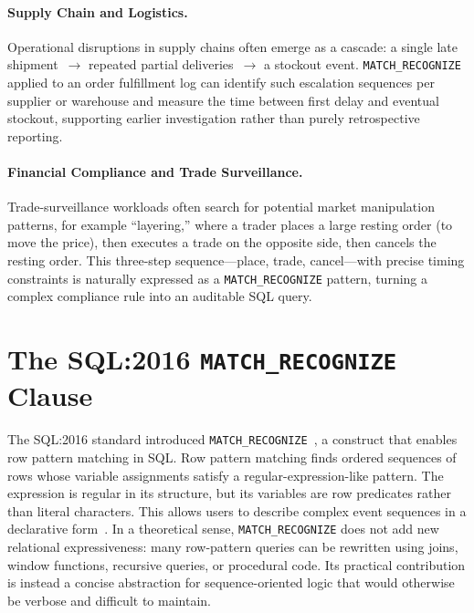 \paragraph{Supply Chain and Logistics.}
Operational disruptions in supply chains often emerge as a cascade:
a single late shipment~$\rightarrow$ repeated partial deliveries~$\rightarrow$
a stockout event.  \texttt{MATCH\_RECOGNIZE} applied to an order
fulfillment log can identify such escalation sequences per supplier or
warehouse and measure the time between first delay and eventual
stockout, supporting earlier investigation rather than purely
retrospective reporting.

\paragraph{Financial Compliance and Trade Surveillance.}
Trade-surveillance workloads often search for potential market
manipulation patterns, for example ``layering,'' where a trader
places a large resting order
(to move the price), then executes a trade on the opposite side, then
cancels the resting order.  This three-step sequence---place, trade,
cancel---with precise timing constraints is naturally expressed as a
\texttt{MATCH\_RECOGNIZE} pattern, turning a complex compliance rule
into an auditable SQL query.


\section{The SQL:2016 \texttt{MATCH\_RECOGNIZE} Clause}
\label{sec:bg-match-recognize}

The SQL:2016 standard introduced
\texttt{MATCH\_RECOGNIZE}~\cite{ISO2016SQL,iso2016}, a construct
that enables row pattern matching in SQL.  Row pattern matching finds
ordered sequences of rows whose variable assignments satisfy a
regular-expression-like pattern.  The expression is regular in its
structure, but its variables are row predicates rather than literal
characters.  This allows users to describe complex event sequences in
a declarative form~\cite{winand2017sqlnew}.  In a theoretical sense,
\texttt{MATCH\_RECOGNIZE} does not add new relational expressiveness:
many row-pattern queries can be rewritten using joins, window
functions, recursive queries, or procedural code.  Its practical
contribution is instead a concise abstraction for sequence-oriented
logic that would otherwise be verbose and difficult to maintain.

